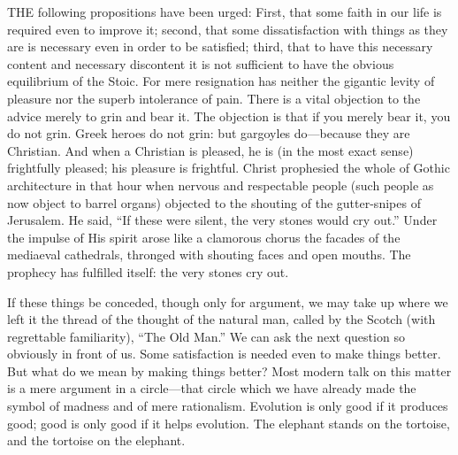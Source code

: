 THE following propositions have been urged: First, that some faith in our life is required even to improve it; second, that some dissatisfaction with things as they are is necessary even in order to be satisfied; third, that to have this necessary content and necessary discontent it is not sufficient to have the obvious equilibrium of the Stoic. For mere resignation has neither the gigantic levity of pleasure nor the superb intolerance of pain. There is a vital objection to the advice merely to grin and bear it. The objection is that if you merely bear it, you do not grin. Greek heroes do not grin: but gargoyles do—because they are Christian. And when a Christian is pleased, he is (in the most exact sense) frightfully pleased; his pleasure is frightful. Christ prophesied the whole of Gothic architecture in that hour when nervous and respectable people (such people as now object to barrel organs) objected to the shouting of the gutter-snipes of Jerusalem. He said, “If these were silent, the very stones would cry out.” Under the impulse of His spirit arose like a clamorous chorus the facades of the mediaeval cathedrals, thronged with shouting faces and open mouths. The prophecy has fulfilled itself: the very stones cry out.

If these things be conceded, though only for argument, we may take up where we left it the thread of the thought of the natural man, called by the Scotch (with regrettable familiarity), “The Old Man.” We can ask the next question so obviously in front of us. Some satisfaction is needed even to make things better. But what do we mean by making things better? Most modern talk on this matter is a mere argument in a circle—that circle which we have already made the symbol of madness and of mere rationalism. Evolution is only good if it produces good; good is only good if it helps evolution. The elephant stands on the tortoise, and the tortoise on the elephant.

